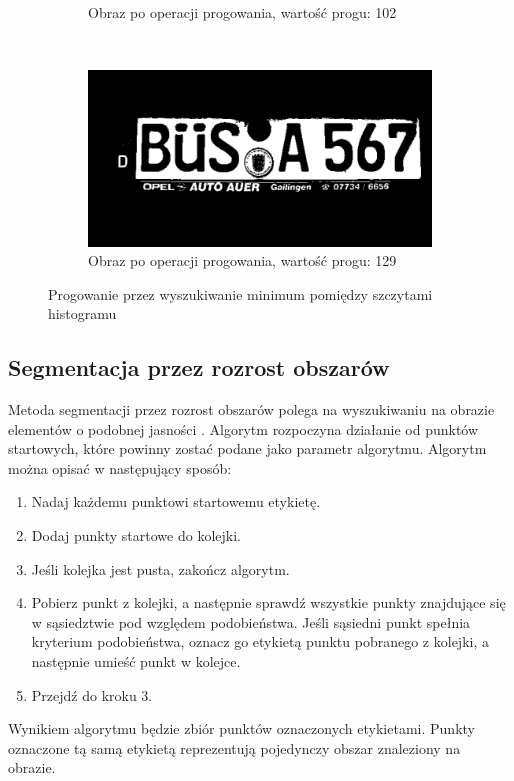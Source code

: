 \begin{figure}
\begin{subfigure}[b]{0.45\textwidth}
    \caption{Obraz po operacji progowania, wartość progu: 102}
    \label{fig:histogram_valleys_bad}
  \end{subfigure}
  ~
  \begin{subfigure}[b]{0.45\textwidth}
    \includegraphics[width=\textwidth]{img/histogram-valleys-good}
    \caption{Obraz po operacji progowania, wartość progu: 129}
    \label{fig:hitogram_valleys_good}
  \end{subfigure}
  \caption{Progowanie przez wyszukiwanie minimum pomiędzy szczytami histogramu}\label{fig:histogram_valleys}
\end{figure}
\subsection{Segmentacja przez rozrost obszarów}
Metoda segmentacji przez rozrost obszarów polega na wyszukiwaniu na obrazie elementów o podobnej jasności \cite{ballard82}. Algorytm rozpoczyna działanie od punktów startowych, które powinny zostać podane jako parametr algorytmu. Algorytm można opisać w następujący sposób:
\begin{enumerate}
  \item Nadaj każdemu punktowi startowemu etykietę.
  \item Dodaj punkty startowe do kolejki.
  \item Jeśli kolejka jest pusta, zakończ algorytm.
  \item Pobierz punkt z kolejki, a następnie sprawdź wszystkie punkty znajdujące się w sąsiedztwie pod względem podobieństwa. Jeśli sąsiedni punkt spełnia kryterium podobieństwa, oznacz go etykietą punktu pobranego z kolejki, a następnie umieść punkt w kolejce.
  \item Przejdź do kroku 3.
\end{enumerate}
Wynikiem algorytmu będzie zbiór punktów oznaczonych etykietami. Punkty oznaczone tą samą etykietą reprezentują pojedynczy obszar znaleziony na obrazie.

